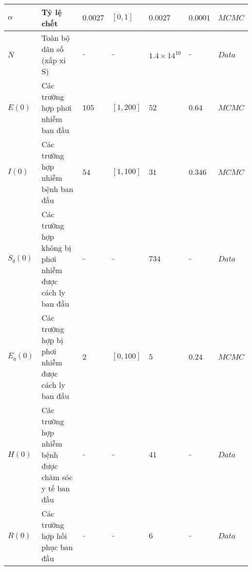 \begin{tabular}{l p{5.5cm} l l l l l}
$\displaystyle \alpha $ & Tỷ lệ chết & $\displaystyle 0.0027$ & $\displaystyle [ 0,1]$ & $\displaystyle 0.0027$ & $\displaystyle 0.0001$ & $\displaystyle MCMC$ \\
\hline 
 $\displaystyle N$ & Toàn bộ dân số (xấp xỉ S) & $\displaystyle \_$ & $\displaystyle \_$ & $\displaystyle 1.4\times 14^{10}$ & $\displaystyle \_$ & $\displaystyle Data$ \\
$\displaystyle E( 0)$ & Các trường hợp phơi nhiễm ban đầu & $\displaystyle 105$ & $\displaystyle [ 1,200]$ & $\displaystyle 52$ & $\displaystyle 0.64$ & $\displaystyle MCMC$ \\
$\displaystyle I( 0)$ & Các trường hợp nhiễm bệnh ban đầu & $\displaystyle 54$ & $\displaystyle [ 1,100]$ & $\displaystyle 31$ & $\displaystyle 0.346$ & $\displaystyle MCMC$ \\
$\displaystyle S_{q}( 0)$ & Các trường hợp không bị phơi nhiễm được cách ly ban đầu & $\displaystyle \_$ & $\displaystyle \_$ & $\displaystyle 734$ & $\displaystyle \_$ & $\displaystyle Data$ \\
$\displaystyle E_{q}( 0)$ & Các trường hợp bị phơi nhiễm được cách ly ban đầu & $\displaystyle 2$ & $\displaystyle [ 0,100]$ & $\displaystyle 5$ & $\displaystyle 0.24$ & $\displaystyle MCMC$ \\
$\displaystyle H( 0)$ & Các trường hợp nhiễm bệnh được chăm sóc y tế ban đầu  & $\displaystyle \_$ & $\displaystyle \_$ & $\displaystyle 41$ & $\displaystyle \_$ & $\displaystyle Data$ \\
$\displaystyle R( 0)$ & Các trường hợp hồi phục ban đầu & $\displaystyle \_$ & $\displaystyle \_$ & $\displaystyle 6$ & $\displaystyle \_$ & $\displaystyle Data$ \\
\hline
\end{tabular}